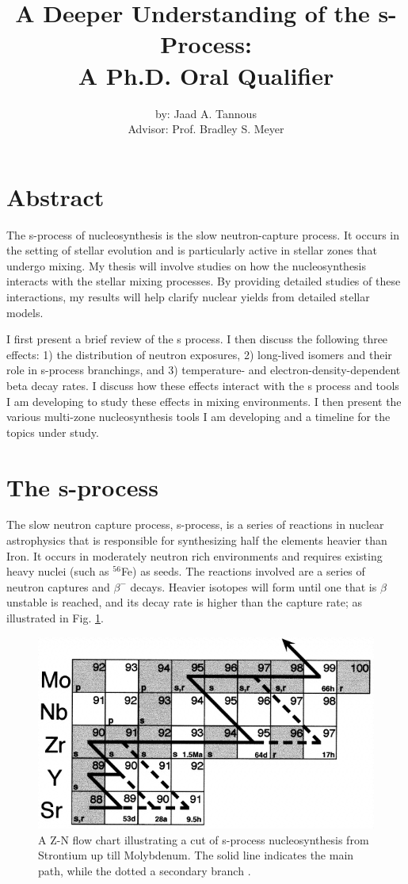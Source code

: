 \documentclass{article}
\title{A Deeper Understanding of the s-Process:\\
A Ph.D. Oral Qualifier}
\author{by: Jaad A. Tannous\\
Advisor: Prof. Bradley S. Meyer}
\date{}
\begin{document}
\maketitle

\section*{Abstract}
The s-process of nucleosynthesis is the slow neutron-capture process.  It occurs
in the setting of stellar evolution and is particularly active in stellar
zones that undergo mixing.  My thesis will involve studies on how the
nucleosynthesis interacts with the stellar mixing processes.  By providing
detailed studies of these interactions, my results will help clarify nuclear
yields from detailed stellar models.

I first present a brief review of the s process.  I then discuss the following
three effects: 1) the distribution of neutron exposures,
2) long-lived isomers and their role in s-process branchings,
and 3) temperature- and electron-density-dependent beta decay rates.
I discuss how these effects interact with the s process
and tools I am developing to study these effects in mixing environments.
I then present the various multi-zone nucleosynthesis tools I am developing
and a timeline for the topics under study.

\section*{The s-process}
The slow neutron capture process, s-process, is a series of reactions in nuclear astrophysics that is responsible 
for synthesizing half the elements heavier than Iron. It occurs in moderately neutron rich environments and requires 
existing heavy nuclei (such as $^{56}$Fe) as seeds. The reactions involved are a series of neutron captures and $\beta^{-}$ decays. Heavier 
isotopes will form until one that is $\beta$ unstable is reached, and its decay rate is higher than the capture rate; as illustrated 
in Fig. \ref{fig 1}.

\begin{figure}[!htp]
    \centerline{\includegraphics[scale = 0.5]{images/sprocess.png}}
    \caption{A Z-N flow chart illustrating a cut of s-process nucleosynthesis from Strontium up till 
    Molybdenum. The solid line indicates the main path, while the dotted a secondary branch \cite{nic98}.}
    \label{fig 1}
\end{figure}
\end{document}
